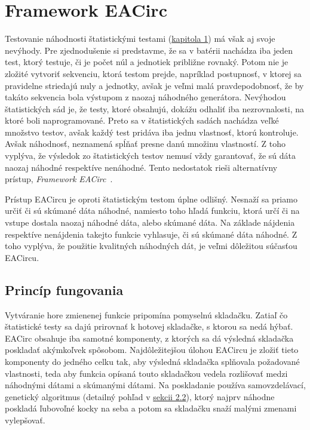 \chapter{Framework EACirc}
\label{chap:eacirc}

Testovanie náhodnosti štatistickými testami (\hyperref[chap:statistic-tests]{kapitola 1}) má však aj svoje nevýhody. Pre zjednodušenie si predstavme, že sa v batérii nachádza iba jeden test, ktorý testuje, či je počet núl a jednotiek približne rovnaký. Potom nie je zložité vytvoriť sekvenciu, ktorá testom prejde, napríklad postupnosť, v ktorej sa pravidelne striedajú nuly a jednotky, avšak je veľmi malá pravdepodobnosť, že by takáto sekvencia bola výstupom z naozaj náhodného generátora. Nevýhodou štatistických sád je, že testy, ktoré obsahujú, dokážu odhaliť iba nezrovnalosti, na ktoré boli naprogramované. Preto sa v štatistických sadách nachádza veľké množstvo testov, avšak každý test pridáva iba jednu vlastnosť, ktorú kontroluje. Avšak náhodnosť, neznamená spĺňať presne danú množinu vlastností. Z toho vyplýva, že výsledok zo štatistických testov nemusí vždy garantovať, že sú dáta naozaj náhodné respektíve nenáhodné. Tento nedostatok rieši alternatívny prístup, \textit{Framework EACirc}~\parencite{ukrop-bc}. 

Prístup EACircu je oproti štatistickým testom úplne odlišný. Nesnaží sa priamo určiť či sú skúmané dáta náhodné, namiesto toho hľadá funkciu, ktorá určí či na vstupe dostala naozaj náhodné dáta, alebo skúmané dáta. Na základe nájdenia respektíve nenájdenia takejto funkcie vyhlasuje, či sú skúmané dáta náhodné. Z toho vyplýva, že použitie kvalitných náhodných dát, je veľmi dôležitou súčasťou EACircu.

\section{Princíp fungovania}
\label{sec:principle}

Vytváranie hore zmienenej funkcie pripomína pomyselnú skladačku. Zatiaľ čo štatistické testy sa dajú prirovnať k hotovej skladačke, s ktorou sa nedá hýbať. EACirc obsahuje iba samotné komponenty, z ktorých sa dá výsledná skladačka poskladať akýmkoľvek spôsobom. Najdôležitejšou úlohou EACircu je zložiť tieto komponenty do jedného celku tak, aby výsledná skladačka splňovala požadované vlastnosti, teda aby funkcia opísaná touto skladačkou vedela rozlišovať medzi náhodnými dátami a skúmanými dátami. Na poskladanie používa samovzdelávací, genetický algoritmus (detailný pohľad v \hyperref[sec:genetics]{sekcii 2.2}), ktorý najprv náhodne poskladá ľubovoľné kocky na seba a potom sa skladačku snaží malými zmenami vylepšovať.


